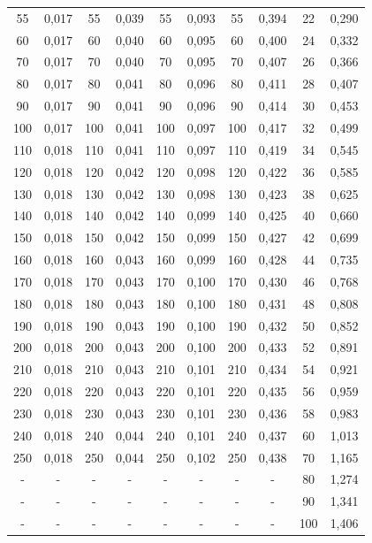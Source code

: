 \begin{table}[H]
\begin{tabular}{c c c c c c c c c c}
55  & 0,017 & 55  & 0,039 & 55  & 0,093 & 55  & 0,394 & 22  & 0,290 \\
60  & 0,017 & 60  & 0,040 & 60  & 0,095 & 60  & 0,400 & 24  & 0,332 \\
70  & 0,017 & 70  & 0,040 & 70  & 0,095 & 70  & 0,407 & 26  & 0,366 \\
80  & 0,017 & 80  & 0,041 & 80  & 0,096 & 80  & 0,411 & 28  & 0,407 \\
90  & 0,017 & 90  & 0,041 & 90  & 0,096 & 90  & 0,414 & 30  & 0,453 \\
100 & 0,017 & 100 & 0,041 & 100 & 0,097 & 100 & 0,417 & 32  & 0,499 \\
110 & 0,018 & 110 & 0,041 & 110 & 0,097 & 110 & 0,419 & 34  & 0,545 \\
120 & 0,018 & 120 & 0,042 & 120 & 0,098 & 120 & 0,422 & 36  & 0,585 \\
130 & 0,018 & 130 & 0,042 & 130 & 0,098 & 130 & 0,423 & 38  & 0,625 \\
140 & 0,018 & 140 & 0,042 & 140 & 0,099 & 140 & 0,425 & 40  & 0,660 \\
150 & 0,018 & 150 & 0,042 & 150 & 0,099 & 150 & 0,427 & 42  & 0,699 \\
160 & 0,018 & 160 & 0,043 & 160 & 0,099 & 160 & 0,428 & 44  & 0,735 \\
170 & 0,018 & 170 & 0,043 & 170 & 0,100 & 170 & 0,430 & 46  & 0,768 \\
180 & 0,018 & 180 & 0,043 & 180 & 0,100 & 180 & 0,431 & 48  & 0,808 \\
190 & 0,018 & 190 & 0,043 & 190 & 0,100 & 190 & 0,432 & 50  & 0,852 \\
200 & 0,018 & 200 & 0,043 & 200 & 0,100 & 200 & 0,433 & 52  & 0,891 \\
210 & 0,018 & 210 & 0,043 & 210 & 0,101 & 210 & 0,434 & 54  & 0,921 \\
220 & 0,018 & 220 & 0,043 & 220 & 0,101 & 220 & 0,435 & 56  & 0,959 \\
230 & 0,018 & 230 & 0,043 & 230 & 0,101 & 230 & 0,436 & 58  & 0,983 \\
240 & 0,018 & 240 & 0,044 & 240 & 0,101 & 240 & 0,437 & 60  & 1,013 \\
250 & 0,018 & 250 & 0,044 & 250 & 0,102 & 250 & 0,438 & 70  & 1,165 \\
 -  &   -   &  -  &   -   &  -  &   -   &  -  &   -   & 80  & 1,274 \\
 -  &   -   &  -  &   -   &  -  &   -   &  -  &   -   & 90  & 1,341 \\
 -  &   -   &  -  &   -   &  -  &   -   &  -  &   -   & 100 & 1,406 \\

\end{tabular}
\end{table}
